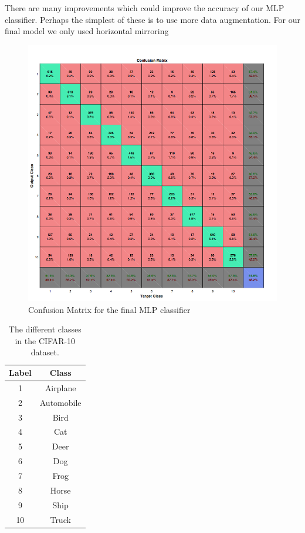 There are many improvements which could improve the accuracy of our MLP classifier. Perhaps the simplest of these is to use more data augmentation. For our final model we only used horizontal mirroring

\begin{figure}[h!]
   \centering
   \includegraphics[width=\textwidth]{images/Confusion_Matrix}
   \caption{Confusion Matrix for the final MLP classifier }
   \label{fig:Conf_Matrix}

\end{figure}

\begin{table}[h]
\begin{center}
 \begin{tabular}{||c | c||}
 \hline
 \textbf{Label} & \textbf{Class} \\ [0.5ex]
 \hline
 1& Airplane\\
 2& Automobile \\
 3& Bird\\
 4& Cat\\
 5& Deer\\
 6& Dog\\
 7& Frog\\
 8& Horse\\
 9& Ship\\
 10& Truck\\[1ex]
 \hline

\end{tabular}
\caption{The different classes in the CIFAR-10 dataset.}
\label{Tab:Classes}
\end{center}
\end{table}
\FloatBarrier
